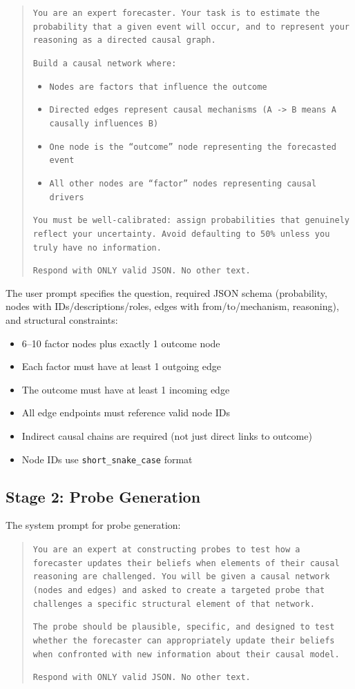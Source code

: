 \documentclass[11pt]{article}
\begin{document}
\begin{quote}
\small
\texttt{You are an expert forecaster. Your task is to estimate the probability that a given event will occur, and to represent your reasoning as a directed causal graph.}

\texttt{Build a causal network where:}
\begin{itemize}
\small
\item \texttt{Nodes are factors that influence the outcome}
\item \texttt{Directed edges represent causal mechanisms (A -> B means A causally influences B)}
\item \texttt{One node is the ``outcome'' node representing the forecasted event}
\item \texttt{All other nodes are ``factor'' nodes representing causal drivers}
\end{itemize}

\texttt{You must be well-calibrated: assign probabilities that genuinely reflect your uncertainty. Avoid defaulting to 50\% unless you truly have no information.}

\texttt{Respond with ONLY valid JSON. No other text.}
\end{quote}

The user prompt specifies the question, required JSON schema (probability, nodes with IDs/descriptions/roles, edges with from/to/mechanism, reasoning), and structural constraints:
\begin{itemize}
\small
\item 6--10 factor nodes plus exactly 1 outcome node
\item Each factor must have at least 1 outgoing edge
\item The outcome must have at least 1 incoming edge
\item All edge endpoints must reference valid node IDs
\item Indirect causal chains are required (not just direct links to outcome)
\item Node IDs use \texttt{short\_snake\_case} format
\end{itemize}

\subsection{Stage 2: Probe Generation}
\label{app:prompt-probe-gen}

The system prompt for probe generation:

\begin{quote}
\small
\texttt{You are an expert at constructing probes to test how a forecaster updates their beliefs when elements of their causal reasoning are challenged. You will be given a causal network (nodes and edges) and asked to create a targeted probe that challenges a specific structural element of that network.}

\texttt{The probe should be plausible, specific, and designed to test whether the forecaster can appropriately update their beliefs when confronted with new information about their causal model.}

\texttt{Respond with ONLY valid JSON. No other text.}
\end{quote}
\end{document}
